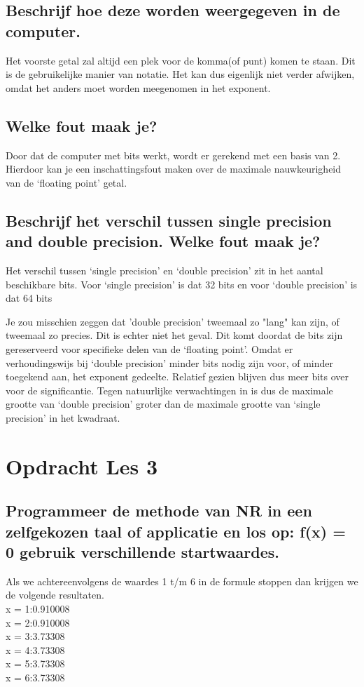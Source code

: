 \documentclass{article}%
\begin{document}
\subsection{\normalsize{Beschrijf hoe deze worden weergegeven in de computer.}}
Het voorste getal zal altijd een plek voor de komma(of punt) komen te staan. Dit is de gebruikelijke manier van notatie. Het kan dus eigenlijk niet verder afwijken, omdat het anders moet worden meegenomen in het exponent.

\subsection{\normalsize{Welke fout maak je?}}
Door dat de computer met bits werkt, wordt er gerekend met een basis van 2. Hierdoor kan je een inschattingsfout maken over de maximale nauwkeurigheid van de ‘floating point’ getal.

\subsection{\normalsize{Beschrijf het verschil tussen single precision and double precision. Welke fout maak je?}}
Het verschil tussen ‘single precision’ en ‘double precision’ zit in het aantal beschikbare bits. Voor ‘single precision’ is dat 32 bits en voor ‘double precision’ is dat 64 bits

Je zou misschien zeggen dat 'double precision' tweemaal zo "lang" kan zijn, of tweemaal zo precies. Dit is echter niet het geval. Dit komt doordat de bits zijn gereserveerd voor specifieke delen van de ‘floating point’. Omdat er verhoudingswijs bij ‘double precision’ minder bits nodig zijn voor, of minder toegekend aan, het exponent gedeelte. Relatief gezien blijven dus meer bits over voor de significantie. Tegen natuurlijke verwachtingen in is dus de maximale grootte van ‘double precision’ groter dan de maximale grootte van ‘single precision’ in het kwadraat.

\clearpage
\section{Opdracht Les 3}
\subsection{\normalsize{Programmeer de methode van NR in een zelfgekozen taal of applicatie en los op: f(x) = 0 gebruik verschillende startwaardes.}}
Als we achtereenvolgens de waardes 1 t/m 6 in de formule stoppen dan krijgen we de volgende resultaten.\\
x = 1:0.910008\\
x = 2:0.910008\\
x = 3:3.73308\\
x = 4:3.73308\\
x = 5:3.73308\\
x = 6:3.73308\\
\end{document}
